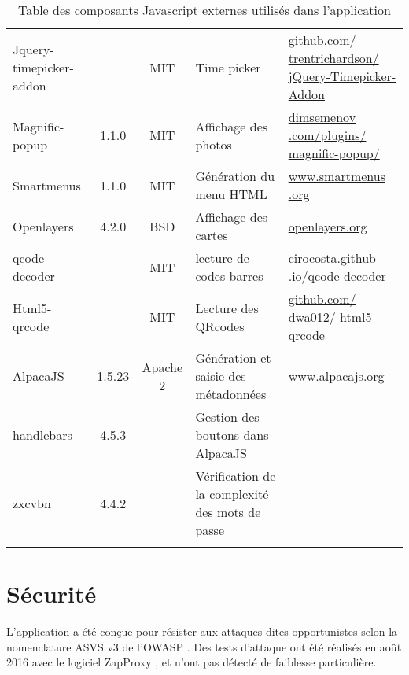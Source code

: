\begin{longtable}{|>{\raggedright\arraybackslash}p{3cm}|c|c|>{\raggedright\arraybackslash}p{3cm}|>{\raggedright\arraybackslash}p{3cm}|}
Jquery-timepicker-addon &  & MIT & Time picker & \href{https://github.com/trentrichardson/jQuery-Timepicker-Addon}{github.com/ trentrichardson/ jQuery-Timepicker-Addon} \\ 

Magnific-popup & 1.1.0 & MIT & Affichage des photos & \href{http://dimsemenov.com/plugins/magnific-popup/}{dimsemenov .com/plugins/ magnific-popup/}\\ 

Smartmenus & 1.1.0 & MIT & Génération du menu HTML & \href{http://www.smartmenus .org}{www.smartmenus .org} \\ 
 
Openlayers & 4.2.0 & BSD & Affichage des cartes & \href{http://openlayers.org/}{openlayers.org} \\ 

qcode-decoder & & MIT & lecture de codes barres & \href{http://cirocosta.github.io/qcode-decoder/}{cirocosta.github .io/qcode-decoder}\\

Html5-qrcode &  & MIT & Lecture des QRcodes &  \href{https://github.com/dwa012/html5-qrcode}{github.com/ dwa012/ html5-qrcode} \\ 

AlpacaJS & 1.5.23 & Apache 2 & Génération et saisie des métadonnées & 
\href{http://www.alpacajs.org/}{www.alpacajs.org}\\

handlebars & 4.5.3 & & Gestion des boutons dans AlpacaJS & \\
zxcvbn & 4.4.2 & & Vérification de la complexité des mots de passe & \\
\hline
\caption{Table des composants Javascript externes utilisés dans l'application}
\end{longtable} 

\section{Sécurité}

L'application a été conçue pour résister aux attaques dites opportunistes selon la nomenclature ASVS v3 \cite{asvs} de l'OWASP \cite{owasp}. Des tests d'attaque ont été réalisés en août 2016 avec le logiciel ZapProxy \cite{zaproxy}, et n'ont pas détecté de faiblesse particulière.

